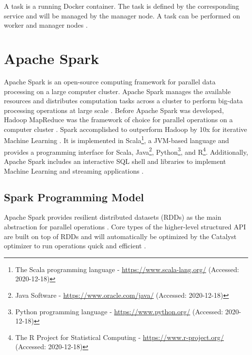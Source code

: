 A task is a running Docker container. The task is defined by the corresponding service and will be managed by the manager node. A task can be performed on worker and manager nodes \cite{Docker2020Docs}.


\section{Apache Spark}
\label{sec:04_spark}
Apache Spark is an open-source computing framework for parallel data processing on a large computer cluster. Apache Spark manages the available resources and distributes computation tasks across a cluster to perform big-data processing operations at large scale \cite{Chambers2018Spark}. Before Apache Spark was developed, Hadoop MapReduce \cite{Dean2010MapReduce} was the framework of choice for parallel operations on a computer cluster \cite{Zaharia2010Spark}. Spark accomplished to outperform Hadoop by 10x for iterative Machine Learning \cite{Zaharia2010Spark}. It is implemented in Scala\footnote{The Scala programming language - \url{https://www.scala-lang.org/} (Accessed: 2020-12-18)}, a JVM-based language and provides a programming interface for Scala, Java\footnote{Java Software - \url{https://www.oracle.com/java/} (Accessed: 2020-12-18)}, Python\footnote{Python programming language - \url{https://www.python.org/} (Accessed: 2020-12-18)}, and R\footnote{The R Project for Statistical Computing - \url{https://www.r-project.org/} (Accessed: 2020-12-18)}. Additionally, Apache Spark includes an interactive SQL shell and libraries to implement Machine Learning and streaming applications \cite{Chambers2018Spark}.


\subsection{Spark Programming Model}
\label{subsec:04_spark_pr-model}
Apache Spark provides resilient distributed datasets (RDDs) as the main abstraction for parallel operations \cite{Zaharia2010Spark}. Core types of the higher-level structured API are built on top of RDDs and will automatically be optimized by the Catalyst optimizer to run operations quick and efficient \cite{Chambers2018Spark, Hien2018Spark}.


